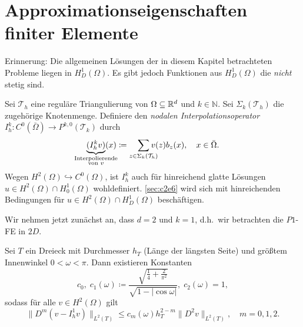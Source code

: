 \documentclass[../skript.tex]{subfiles}
\begin{document}
\section{Approximationseigenschaften finiter Elemente}\label{sec:c2e5}
Erinnerung: Die allgemeinen Lösungen der in diesem Kapitel betrachteten Probleme liegen in $H^1_D(\Omega)$. Es gibt jedoch Funktionen aus $H^1_D(\Omega)$ die \emph{nicht} stetig sind.
\begin{definition}\label{def:c2e5s1}
	Sei $\mathcal{T}_h$ eine reguläre Triangulierung von $\Omega\subseteq\mathbb{R}^d$ und $k\in\mathbb{N}$. Sei $\Sigma_k(\mathcal{T}_h)$ die zugehörige Knotenmenge. Definiere den \emph{nodalen Interpolationsoperator} $I_h^k:C^0(\bar{\Omega})\to P^{k,0}(\mathcal{T}_k)$ durch 
	\[
		\underbrace{(I_h^k v)}_{\mathclap{\substack{\text{Interpolierende} \\ \text{von } v}}}(x) \coloneqq \sum_{z\in \Sigma_k(\mathcal{T}_h)} \hspace*{-10pt} v(z)b_z(x),\quad x\in\bar{\Omega}.
	\]  
	Wegen $H^2(\Omega)\hookrightarrow C^0(\Omega)$, ist $I_h^k$ auch für hinreichend glatte Lösungen $u\in H^2(\Omega)\cap H^1_0(\Omega)$ wohldefiniert. \cref{sec:c2e6} wird sich mit hinreichenden Bedingungen für $u\in H^2(\Omega)\cap H^1_D(\Omega)$ beschäftigen.
\end{definition}
Wir nehmen jetzt zunächst an, dass $d=2$ und $k=1$, d.h.\ wir betrachten die $P1$-FE in $2D$.
\begin{theorem}[Interpolationsfehlerabschätzung]\label{thm:c2e5s2}
	Sei $T$ ein Dreieck mit Durchmesser $h_T$ (Länge der längsten Seite) und größtem Innenwinkel $0 < \omega < \pi$. Dann existieren Konstanten 
	\[
		c_0,\;c_1(\omega)\coloneqq\frac{\sqrt{\frac{1}{4}+\frac{2}{\pi^2}}}{\sqrt{1-|\cos{\omega}|}},\; c_2(\omega) = 1,
	\]
	sodass für alle $v\in H^2(\Omega)$ gilt
	\[
		\| D^m(v-I_h^1 v)\|_{L^2(T)} \leq c_m(\omega)h_T^{2-m}\| D^2 v\|_{L^2(T)},\quad m=0,1,2.
	\]
\end{theorem}
\end{document}
